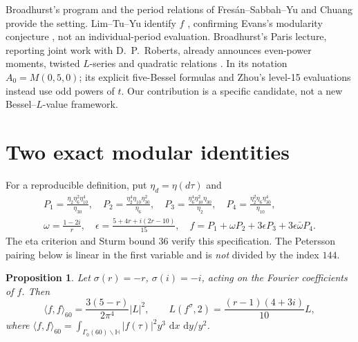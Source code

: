\documentclass[11pt]{article}
\numberwithin{equation}{section}
\newtheorem{proposition}[theorem]{Proposition}
\theoremstyle{definition}
\theoremstyle{remark}
\newcommand{\dd}{\,\mathrm d}
\theoremstyle{plain}
\begin{document}
Broadhurst's program \cite{Bro16,Bro17Paris} and the period relations of
Fres\'an--Sabbah--Yu \cite{FSY} and Chuang \cite{Chu} provide the setting.
Lim--Tu--Yu identify $f$ \cite[Theorem~1.2.2(iii)]{LTY}, confirming Evans's
modularity conjecture \cite[\S4]{Evans}, not an individual-period evaluation.
Broadhurst's Paris lecture, reporting joint work with D.~P.~Roberts, already
announces even-power moments, twisted $L$-series and quadratic relations
\cite[pp.~13, 15]{Bro17Paris}. In its notation $A_0=M(0,5,0)$;
its explicit five-Bessel formulas \cite[\S\S2.1, 2.5]{Bro17Paris} and
Zhou's level-15 evaluations \cite{ZhouW} instead use odd powers of $t$.
Our contribution is a specific candidate, not a new Bessel--$L$-value framework.

\section{Two exact modular identities}
For a reproducible definition, put $\eta_d=\eta(d\tau)$ and
\begin{equation}\label{eq:eta}
\begin{gathered}
 P_1=\frac{\eta_2\eta_6^2\eta_{10}^4}{\eta_{30}},\quad
 P_2=\frac{\eta_2^4\eta_{10}\eta_{30}^2}{\eta_6},\quad
 P_3=\frac{\eta_6^4\eta_{10}^2\eta_{30}}{\eta_2},\quad
 P_4=\frac{\eta_2^2\eta_6\eta_{30}^4}{\eta_{10}},\\
 \omega=\frac{1-2i}{r},\quad
 \epsilon=\frac{5+4r+i(2r-10)}{15},\quad
 f=P_1+\omega P_2+3\epsilon P_3+3\epsilon\bar\omega P_4.
\end{gathered}
\end{equation}
The eta criterion and Sturm bound $36$ verify this specification.
The Petersson pairing below is linear in the first variable and is
\emph{not} divided by the index $144$.
\begin{proposition}\label{prop:modular}
Let $\sigma(r)=-r$, $\sigma(i)=-i$, acting on the Fourier coefficients of $f$.
Then
\begin{equation}\label{eq:normtwist}
 \boxed{\langle f,f\rangle_{60}
 =\frac{3(5-r)}{2\pi^4}|L|^2,\qquad
 L(f^\sigma,2)=\frac{(r-1)(4+3i)}{10}L,}
\end{equation}
where $\langle f,f\rangle_{60}
=\int_{\Gamma_0(60)\backslash\mathbb H}|f(\tau)|^2y^3\,\dd x\,\dd y/y^2$.
\end{proposition}
\end{document}
